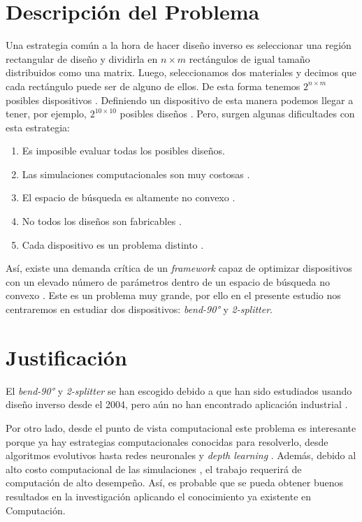 \section{Descripción del  Problema}

Una estrategia común a la hora de hacer diseño inverso es seleccionar una región rectangular de diseño y dividirla en $n \times m$ rectángulos
de igual tamaño distribuidos como una matrix. 
Luego, seleccionamos dos materiales y decimos que cada rectángulo puede ser de alguno de ellos. 
De esta forma tenemos $2^{n \times m}$ posibles dispositivos \cite{Su2020}. 
Definiendo un dispositivo de esta manera podemos llegar a tener, por ejemplo, $2^{10 \times 10}$ posibles diseños \cite{Malheiros-Silveira2020}.
Pero, surgen algunas dificultades con esta estrategia:

\begin{enumerate}
  \item Es imposible evaluar todas los posibles diseños.
  \item Las simulaciones computacionales son muy costosas \cite{Kudyshev2020}.
  \item El espacio de búsqueda es altamente no convexo \cite{Su2018}.
  \item No todos los diseños son fabricables \cite{Su2020}.
  \item Cada dispositivo es un problema distinto \cite{Molesky2018}.
\end{enumerate}


Así, existe una demanda crítica de un \emph{framework} capaz de optimizar dispositivos con un elevado número de parámetros dentro de un espacio de búsqueda no convexo \cite{Kudyshev2020}. Este es un problema muy grande, por ello en el presente estudio nos centraremos en estudiar dos dispositivos: \emph{bend-90°} y \emph{2-splitter}.

\section{Justificación}

El \emph{bend-90°} y \emph{2-splitter} se han escogido debido a que han sido estudiados usando diseño inverso desde el 2004, pero aún no han encontrado aplicación industrial \cite{Molesky2018}. 

Por otro lado, desde el punto de vista computacional este problema es interesante porque ya hay estrategias computacionales conocidas para resolverlo, desde algoritmos evolutivos \cite{Hansen2016} hasta redes neuronales \cite{Goodfellow2015} y \emph{depth learning} \cite{Malkiel2018}. 
Además, debido al alto costo computacional de las simulaciones \cite{Schneider2019}, el trabajo requerirá de computación de alto desempeño.
Así, es probable que se pueda obtener buenos resultados en la investigación aplicando el conocimiento ya existente en Computación.

